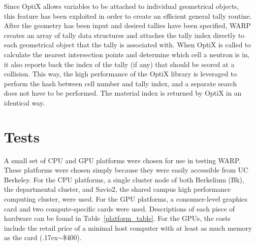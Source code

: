 \documentclass[preprint,12pt]{elsarticle}
\begin{document}
Since OptiX allows variables to be attached to individual geometrical objects, this feature has been exploited in order to create an efficient general tally routine.  After the geometry has been input and desired tallies have been specified, WARP creates an array of tally data structures and attaches the tally index directly to each geometrical object that the tally is associated with.  When OptiX is called to calculate the nearest intersection points and determine which cell a neutron is in, it also reports back the index of the tally (if any) that should be scored at a collision.  This way, the high performance of the OptiX library is leveraged to perform the hash between cell number and tally index, and a separate search does not have to be performed.  The material index is returned by OptiX in an identical way.


\newpage
\section{Tests}
\label{sec:tests}

A small set of CPU and GPU platforms were chosen for use in testing WARP.  These platforms were chosen simply because they were easily accessible from UC Berkeley.  For the CPU platforms, a single cluster node of both Berkelium (Bk), the departmental cluster, and Savio2, the shared campus high performance computing cluster, were used.  For the GPU platforms, a consumer-level graphics card and two compute-specific cards were used.  Descriptions of each piece of hardware can be found in Table~\ref{platform_table}. For the GPUs, the costs include the retail price of a minimal host computer with at least as much memory as the card ({\raise.17ex\hbox{$\scriptstyle\sim$}}\$400).
  
\end{document}
